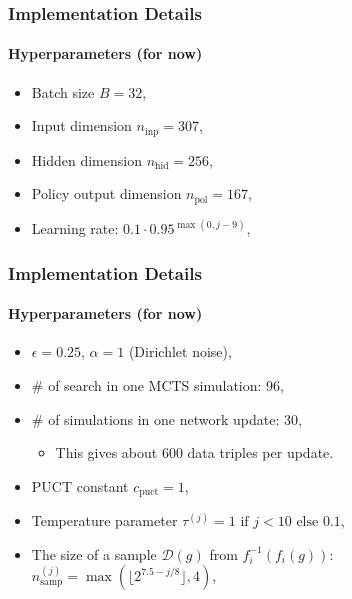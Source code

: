 \begin{frame}[fragile]
  \frametitle{Implementation Details}
  \framesubtitle{Hyperparameters (for now)}

  \begin{itemize}
    \item Batch size $B = 32$,
    \item Input dimension $n_\text{inp} = 307$,
    \item Hidden dimension $n_\text{hid} = 256$,
    \item Policy output dimension $n_\text{pol} = 167$,
    \item Learning rate: $0.1 \cdot 0.95^{\max(0, j - 9)}$,
  \end{itemize}
\end{frame}

\begin{frame}[fragile]
  \frametitle{Implementation Details}
  \framesubtitle{Hyperparameters (for now)}

  \begin{itemize}
    \item $\epsilon = 0.25$, $\alpha = 1$ (Dirichlet noise),
    \item $\#$ of search in one MCTS simulation: $96$,
    \item $\#$ of simulations in one network update: $30$,
    \begin{itemize}
      \item This gives about 600 data triples per update.
    \end{itemize}
    \item PUCT constant $c_\text{puct} = 1$,
    \item Temperature parameter $\tau^{(j)} = 1\text{ if }j < 10\text{ else }0.1$,
    \item The size of a sample $\mathcal D(g)$ from $f_i^{-1}(f_i(g))$: $n_\text{samp}^{(j)} = \max(\lfloor 2^{7.5 - j / 8} \rfloor, 4)$,
  \end{itemize}
\end{frame}

